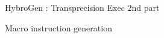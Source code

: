\begin{Frame}{HybroGen : Transprecision Exec 2nd part}
  \begin{block}{Macro instruction generation}
    
  \end{block}
\end{Frame}
